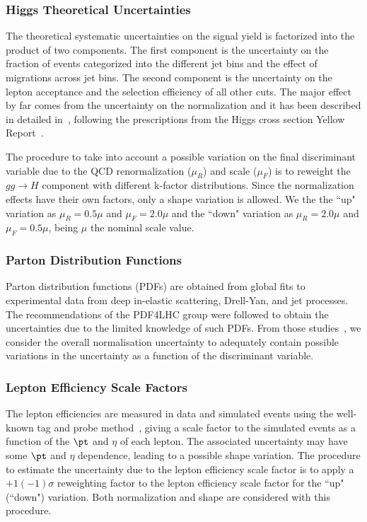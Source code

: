 \subsubsection{Higgs Theoretical Uncertainties}
The theoretical systematic uncertainties on the signal yield is factorized into 
the product of two components. The first component is the uncertainty on the 
fraction of events categorized into the different jet bins and the effect of 
migrations across jet bins. The second component is the uncertainty on the 
lepton acceptance and the selection efficiency of all other cuts. The major
effect by far comes from the uncertainty on the normalization and it has been
described in detailed in~\cite{hww_eps, hww_lp}, following the prescriptions from
the Higgs cross section Yellow 
Report~\cite{LHCHiggsCrossSectionWorkingGroup:2011ti}.

The procedure to take into account a possible variation 
on the final discriminant variable due to the QCD renormalization ($\mu_R$) 
and scale ($\mu_F$) is to reweight the $gg \to H$ component with different k-factor
distributions. Since the normalization effects have their own factors, only a
shape variation is allowed. We the the ``up" variation as 
$\mu_R = 0.5\mu$ and $\mu_F =2.0\mu$ and the ``down" variation as 
$\mu_R = 2.0\mu$ and $\mu_F =0.5\mu$, being $\mu$ the nominal scale value.

\subsubsection{Parton Distribution Functions}
Parton distribution functions (PDFs) are obtained from global fits 
to experimental data from deep in-elastic scattering, Drell-Yan, and jet 
processes. The recommendations of the PDF4LHC group were followed to obtain the
uncertainties due to the limited knowledge of such PDFs. From those studies~\cite{hww_eps, hww_lp}, 
we consider the overall normalisation uncertainty to adequately contain possible 
variations in the uncertainty as a function of the discriminant variable.

\subsubsection{Lepton Efficiency Scale Factors}
The lepton efficiencies are measured in data and simulated events using the 
well-known tag and probe method~\cite{hww_eps}, giving a scale factor to the
simulated events as a function of the $\pt$ and $\eta$ of each lepton. The
associated uncertainty may have some $\pt$ and $\eta$ dependence, leading to a
possible shape variation. The procedure to estimate the uncertainty due to the
lepton efficiency scale factor is to apply a $+1(-1)\sigma$ reweighting factor to the
lepton efficiency scale factor for the ``up" (``down") variation. Both
normalization and shape are considered with this procedure.

